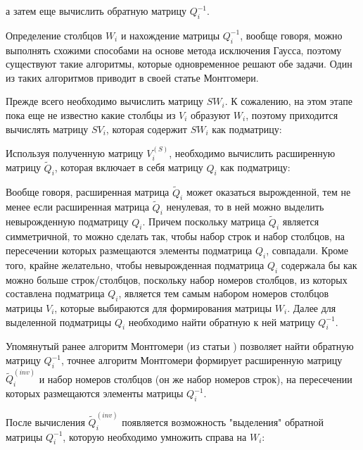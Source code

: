 а затем еще вычислить обратную матрицу $Q_i^{-1}$.

Определение столбцов $W_i$ и нахождение матрицы $Q_i^{-1}$, вообще говоря, можно выполнять схожими способами на основе метода исключения Гаусса, поэтому существуют
такие алгоритмы, которые одновременное решают обе задачи. Один из таких алгоритмов приводит в своей статье \cite{Montgomery} Монтгомери.

Прежде всего необходимо вычислить матрицу $S W_i$. К сожалению, на этом этапе пока еще не известно какие столбцы из $V_i$ образуют $W_i$, поэтому приходится вычислять
матрицу $S V_i$, которая содержит $S W_i$ как подматрицу:


Используя полученную матрицу $V_i^{(S)}$, необходимо вычислить расширенную матрицу $\widetilde{Q}_i$, которая включает в себя матрицу $Q_i$ как подматрицу:


Вообще говоря, расширенная матрица $\widetilde{Q}_i$ может оказаться вырожденной, тем не менее если расширенная матрица $\widetilde{Q}_i$ ненулевая, то в ней можно
выделить невырожденную подматрицу $Q_i$. Причем поскольку матрица $\widetilde{Q}_i$ является симметричной, то можно сделать так, чтобы набор строк и набор столбцов,
на пересечении которых размещаются элементы подматрица $Q_i$, совпадали. Кроме того, крайне желательно, чтобы невырожденная подматрица $Q_i$ содержала бы как можно
больше строк/столбцов, поскольку набор номеров столбцов, из которых составлена подматрица $Q_i$, является тем самым набором номеров столбцов матрицы $V_i$, которые
выбираются для формирования матрицы $W_i$. Далее для выделенной подматрицы $Q_i$ необходимо найти обратную к ней матрицу $Q_i^{-1}$.

Упомянутый ранее алгоритм Монтгомери (из статьи \cite{Montgomery}) позволяет найти обратную матрицу $Q_i^{-1}$, точнее алгоритм Монтгомери формирует расширенную
матрицу $\widetilde{Q}_i^{(inv)}$ и набор номеров столбцов (он же набор номеров строк), на пересечении которых размещаются элементы матрицы $Q_i^{-1}$.


После вычисления $\widetilde{Q}_i^{(inv)}$ появляется возможность "выделения"{} обратной матрицы $Q_i^{-1}$, которую необходимо умножить справа на $W_i$:

